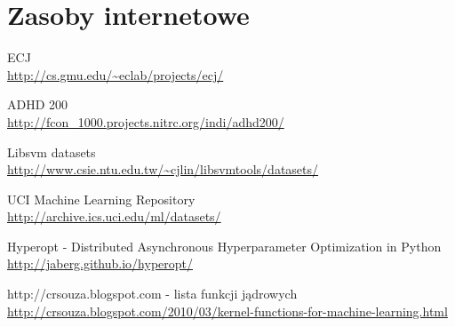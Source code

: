 \chapter*{Zasoby internetowe}\label{sect:web-resources}%

\newcommand{\tturl}{\begingroup \urlstyle{tt}\Url}

{\small
\begin{enumerate}[{[}A{]}]
	\item \label{url:ecj} ECJ \\
		\url{http://cs.gmu.edu/~eclab/projects/ecj/}

	\item \label{url:adhd200} ADHD 200 \\
		\url{	http://fcon_1000.projects.nitrc.org/indi/adhd200/}

	\item \label{url:libsvm} Libsvm datasets \\
		\url{	http://www.csie.ntu.edu.tw/~cjlin/libsvmtools/datasets/}							
	\item \label{url:uci} UCI Machine Learning Repository \\
		\url{http://archive.ics.uci.edu/ml/datasets/}
		
	\item \label{url:hyperopt} Hyperopt - Distributed Asynchronous Hyperparameter Optimization in Python\\
		\url{http://jaberg.github.io/hyperopt/}
		
	\item \label{url:kernels} http://crsouza.blogspot.com  - lista funkcji jądrowych \url{http://crsouza.blogspot.com/2010/03/kernel-functions-for-machine-learning.html}		
\end{enumerate}
}
